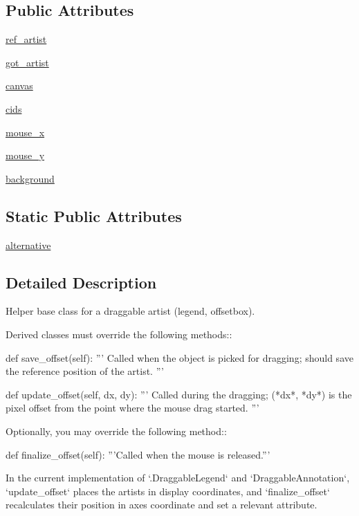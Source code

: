 \subsection*{Public Attributes}
\begin{DoxyCompactItemize}
\item 
\hyperlink{classmatplotlib_1_1offsetbox_1_1DraggableBase_aee9675f921b3b97a1b75e20fc11bf8ba}{ref\+\_\+artist}
\item 
\hyperlink{classmatplotlib_1_1offsetbox_1_1DraggableBase_a4b802890c82817de2dacca56d4554fcf}{got\+\_\+artist}
\item 
\hyperlink{classmatplotlib_1_1offsetbox_1_1DraggableBase_a263fd42b79c955d6f2d98afc403cac88}{canvas}
\item 
\hyperlink{classmatplotlib_1_1offsetbox_1_1DraggableBase_a4e7f0b411ac7e7fe53296aa322af2711}{cids}
\item 
\hyperlink{classmatplotlib_1_1offsetbox_1_1DraggableBase_a8e4a0c79486802cd30135e490192cf7c}{mouse\+\_\+x}
\item 
\hyperlink{classmatplotlib_1_1offsetbox_1_1DraggableBase_a6ca99f0057c8d8a277dc132a0a66fd78}{mouse\+\_\+y}
\item 
\hyperlink{classmatplotlib_1_1offsetbox_1_1DraggableBase_ab34258eeb6f79839c6fc1c9b6e6ae22c}{background}
\end{DoxyCompactItemize}
\subsection*{Static Public Attributes}
\begin{DoxyCompactItemize}
\item 
\hyperlink{classmatplotlib_1_1offsetbox_1_1DraggableBase_a828bbdb711ad36f22179e355a67438ca}{alternative}
\end{DoxyCompactItemize}


\subsection{Detailed Description}
\begin{DoxyVerb}Helper base class for a draggable artist (legend, offsetbox).

Derived classes must override the following methods::

    def save_offset(self):
        '''
        Called when the object is picked for dragging; should save the
        reference position of the artist.
        '''

    def update_offset(self, dx, dy):
        '''
        Called during the dragging; (*dx*, *dy*) is the pixel offset from
        the point where the mouse drag started.
        '''

Optionally, you may override the following method::

    def finalize_offset(self):
        '''Called when the mouse is released.'''

In the current implementation of `.DraggableLegend` and
`DraggableAnnotation`, `update_offset` places the artists in display
coordinates, and `finalize_offset` recalculates their position in axes
coordinate and set a relevant attribute.
\end{DoxyVerb}
 

